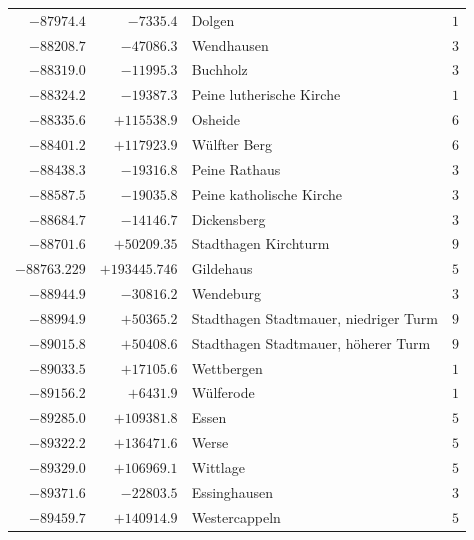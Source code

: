\begin{center}
\begin{tabular}{r|r|p{170pt}|r}
\(-87974.4\)&\(-7335.4\)&Dolgen&\(1\)\\
\(-88208.7\)&\(-47086.3\)&Wendhausen&\(3\)\\
\(-88319.0\)&\(-11995.3\)&Buchholz&\(3\)\\
\(-88324.2\)&\(-19387.3\)&Peine lutherische Kirche&\(1\)\\
\(-88335.6\)&\(+115538.9\)&Osheide&\(6\)\\
\(-88401.2\)&\(+117923.9\)&Wülfter Berg&\(6\)\\
\(-88438.3\)&\(-19316.8\)&Peine Rathaus&\(3\)\\
\(-88587.5\)&\(-19035.8\)&Peine katholische Kirche&\(3\)\\
\(-88684.7\)&\(-14146.7\)&Dickensberg&\(3\)\\
\(-88701.6\)&\(+50209.35\)&Stadthagen Kirchturm&\(9\)\\
\(-88763.229\)&\(+193445.746\)&Gildehaus&\(5\)\\
\(-88944.9\)&\(-30816.2\)&Wendeburg&\(3\)\\
\(-88994.9\)&\(+50365.2\)&Stadthagen Stadtmauer, niedriger Turm&\(9\)\\
\(-89015.8\)&\(+50408.6\)&Stadthagen Stadtmauer, höherer Turm&\(9\)\\
\(-89033.5\)&\(+17105.6\)&Wettbergen&\(1\)\\
\(-89156.2\)&\(+6431.9\)&Wülferode&\(1\)\\
\(-89285.0\)&\(+109381.8\)&Essen&\(5\)\\
\(-89322.2\)&\(+136471.6\)&Werse&\(5\)\\
\(-89329.0\)&\(+106969.1\)&Wittlage&\(5\)\\
\(-89371.6\)&\(-22803.5\)&Essinghausen&\(3\)\\
\(-89459.7\)&\(+140914.9\)&Westercappeln&\(5\)\\
\hline\end{tabular}\endgroup\end{center}
